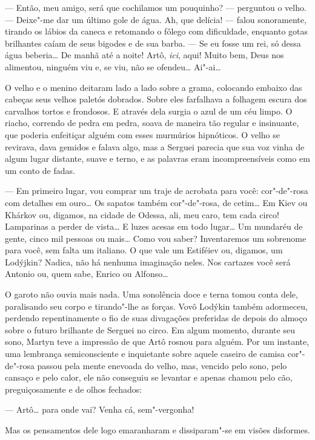 --- Então, meu amigo, será que cochilamos um pouquinho? --- perguntou o
velho. --- Deixe"-me dar um último gole de água. Ah, que delícia! ---
falou sonoramente, tirando os lábios da caneca e retomando o fôlego com
dificuldade, enquanto gotas brilhantes caíam de seus bigodes e de sua
barba. --- Se eu fosse um rei, só dessa água beberia\ldots{} De manhã até a
noite! Artô, \emph{ici}, aqui! Muito bem, Deus nos alimentou, ninguém
viu e, se viu, não se ofendeu\ldots{} Ai"-ai\ldots{}

O velho e o menino deitaram lado a lado sobre a grama, colocando embaixo
das cabeças seus velhos paletós dobrados. Sobre eles farfalhava a
folhagem escura dos carvalhos tortos e frondosos. E através dela surgia
o azul de um céu limpo. O riacho, correndo de pedra em pedra, soava de
maneira tão regular e insinuante, que poderia enfeitiçar alguém com
esses murmúrios hipnóticos. O velho se revirava, dava gemidos e falava
algo, mas a Serguei parecia que sua voz vinha de algum lugar distante,
suave e terno, e as palavras eram incompreensíveis como em um conto de
fadas.

--- Em primeiro lugar, vou comprar um traje de acrobata para você:
cor"-de"-rosa com detalhes em ouro\ldots{} Os sapatos também cor"-de"-rosa, de
cetim\ldots{} Em Kiev ou Khárkov ou, digamos, na cidade de Odessa, ali, meu
caro, tem cada circo! Lamparinas a perder de vista\ldots{} E luzes acesas em
todo lugar\ldots{} Um mundaréu de gente, cinco mil pessoas ou mais\ldots{} Como
vou saber? Inventaremos um sobrenome para você, sem falta um italiano. O
que vale um Estiféiev ou, digamos, um Lodýjkin? Nadica, não há nenhuma
imaginação neles. Nos cartazes você será Antonio ou, quem sabe,
Enrico ou Alfonso\ldots{}

O garoto não ouvia mais nada. Uma sonolência doce e terna tomou conta
dele, paralisando seu corpo e tirando"-lhe as forças. Vovô Lodýkin também
adormeceu, perdendo repentinamente o fio de suas divagações preferidas
de depois do almoço sobre o futuro brilhante de Serguei no circo. Em
algum momento, durante seu sono, Martyn teve a impressão de que Artô
rosnou para alguém. Por um instante, uma lembrança semiconsciente e
inquietante sobre aquele caseiro de camisa cor"-de"-rosa passou pela mente
enevoada do velho, mas, vencido pelo sono, pelo cansaço e pelo calor,
ele não conseguiu se levantar e apenas chamou pelo cão, preguiçosamente
e de olhos fechados:

--- Artô\ldots{} para onde vai? Venha cá, sem"-vergonha!

Mas os pensamentos dele logo emaranharam e dissiparam"-se em visões
disformes.

